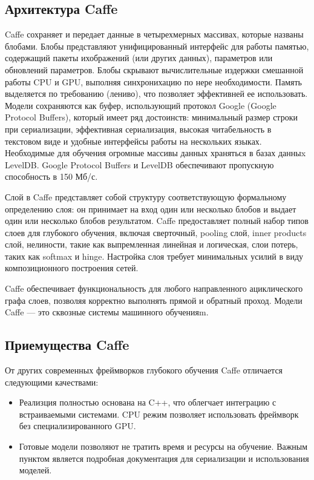 \documentclass[a4paper,english,russian]{G2-105}
\begin{document}
\subsection{Архитектура Caffe}
\par Caffe сохраняет и передает данные в четырехмерных массивах, которые названы блобами. Блобы представляют унифицированный интерфейс для работы  памятью, содержащий пакеты ихображений (или других данных), параметров или обновлений параметров. Блобы скрывают вычислительные издержки смешанной работы CPU и GPU, выполняя синхронихацию по нере необходимости. Память выделяется по требованию (лениво), что позволяет эффективней ее использовать. Модели сохраняются как буфер, использующий протокол Google (Google Protocol Buffers), который имеет ряд достоинств: минимальный размер строки при сериализации, эффективная сериализация, высокая читабельность в текстовом виде и удобные интерфейсы работы на нескольких языках. Необходимые для обучения огромные массивы данных храняться в базах данныx LevelDB. Google Protocol Buffers и LevelDB обеспечивают пропускную способность в 150 Мб/с. 
\par Слой в Caffe представляет собой структуру соответствующую формальному определению слоя: он принимает на вход один или несколько блобов и выдает один или несколько блобов результатом. Caffe предоставляет полный набор типов слоев для глубокого обучения, включая сверточный, pooling слой, inner products слой, нелиности, такие как выпремленная линейная и логическая, слои потерь, таких как softmax и hinge. Настройка слоя требует минимальных усилий в виду композиционного построения сетей.
\par Caffe обеспечивает функциональность для любого направленного ациклического графа слоев, позволяя корректно выполнять прямой и обратный проход. Модели Caffe --- это сквозные системы машинного обученияm.
\ttl
\subsection{Приемущества Caffe}
\par От других современных фреймворков глубокого обучения Caffe отличается следующими качествами:
\begin{itemize}
	\item Реализция полностью основана на C++, что облегчает интеграцию с встраиваемыми системами. CPU режим позволяет использовать фреймворк без специализированного GPU.
	\item Готовые модели позволяют не тратить время и ресурсы на обучение. Важным пунктом является подробная документация для сериализации и использования моделей.
\end{itemize}
\ttl
\end{document}

